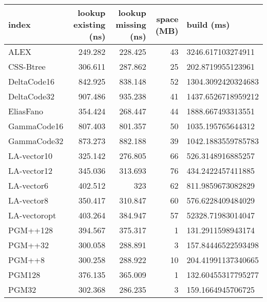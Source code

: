 \begin{tabular}{lrrrl}
\hline
 index             &   lookup existing (ns) &   lookup missing (ns) &   space (MB) & build (ms)         \\
\hline
 ALEX              &                249.282 &               228.425 &           43 & 3246.617103274911  \\
 CSS-Btree         &                306.611 &               287.862 &           25 & 202.8719955123961  \\
 DeltaCode16       &                842.925 &               838.148 &           52 & 1304.3092420324683 \\
 DeltaCode32       &                907.486 &               935.238 &           41 & 1437.6526718959212 \\
 EliasFano         &                354.424 &               268.447 &           44 & 1888.667493313551  \\
 GammaCode16       &                807.403 &               801.357 &           50 & 1035.195765644312  \\
 GammaCode32       &                873.273 &               882.188 &           39 & 1042.1883559785783 \\
 LA-vector10       &                325.142 &               276.805 &           66 & 526.3148916885257  \\
 LA-vector12       &                345.036 &               313.693 &           76 & 434.2422457411885  \\
 LA-vector6        &                402.512 &               323     &           62 & 811.9859673082829  \\
 LA-vector8        &                350.417 &               310.847 &           60 & 576.6228409484029  \\
 LA-vectoropt      &                403.264 &               384.947 &           57 & 52328.71983014047  \\
 PGM++128          &                394.567 &               375.317 &            1 & 131.2911598943174  \\
 PGM++32           &                300.058 &               288.891 &            3 & 157.84446522593498 \\
 PGM++8            &                300.258 &               288.922 &           10 & 204.41991137340665 \\
 PGM128            &                376.135 &               365.009 &            1 & 132.60455317795277 \\
 PGM32             &                302.368 &               286.235 &            3 & 159.1664945706725  \\

\end{tabular}
